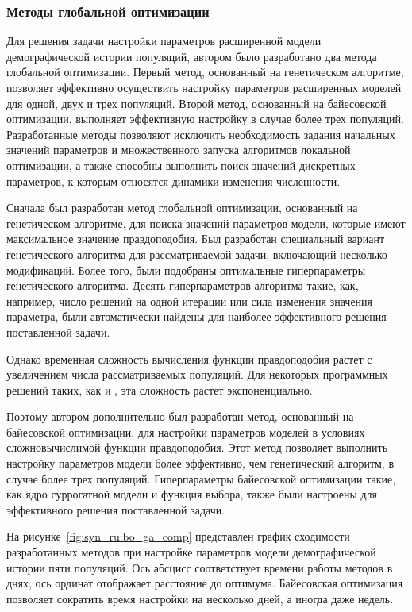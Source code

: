 \documentclass[a4paper,14pt,oneside,openany,article]{memoir}
\begin{document}
\subsubsection*{Методы глобальной оптимизации}

Для решения задачи настройки параметров расширенной модели демографической истории популяций, автором было разработано два метода глобальной оптимизации.
Первый метод, основанный на генетическом алгоритме, позволяет эффективно осуществить настройку параметров расширенных моделей для одной, двух и трех популяций.
Второй метод, основанный на байесовской оптимизации, выполняет эффективную настройку в случае более трех популяций.
Разработанные методы позволяют исключить необходимость задания начальных значений параметров и множественного запуска алгоритмов локальной оптимизации, а также способны выполнить поиск значений дискретных параметров, к которым относятся динамики изменения численности.

Сначала был разработан метод глобальной оптимизации, основанный на генетическом алгоритме, для поиска значений параметров модели, которые имеют максимальное значение правдоподобия.
Был разработан специальный вариант генетического алгоритма для рассматриваемой задачи, включающий несколько модификаций.
Более того, были подобраны оптимальные гиперпараметры генетического алгоритма.
Десять гиперпараметров алгоритма такие, как, например, число решений на одной итерации или сила изменения значения параметра, были автоматически найдены для наиболее эффективного решения поставленной задачи.

Однако временная сложность вычисления функции правдоподобия растет с увеличением числа рассматриваемых популяций.
Для некоторых программных решений таких, как \dadi и \moments, эта сложность растет экспоненциально.

Поэтому автором дополнительно был разработан метод, основанный на байесовской оптимизации, для настройки параметров моделей в условиях сложновычислимой функции правдоподобия.
Этот метод позволяет выполнить настройку параметров модели более эффективно, чем генетический алгоритм, в случае более трех популяций.
Гиперпараметры байесовской оптимизации такие, как ядро суррогатной модели и функция выбора, также были настроены для эффективного решения поставленной задачи.

На рисунке~\ref{fig:syn_ru:bo_ga_comp} представлен график сходимости разработанных методов при настройке параметров модели демографической истории пяти популяций.
Ось абсцисс соответствует времени работы методов в днях, ось ординат отображает расстояние до оптимума.
Байесовская оптимизация позволяет сократить время настройки на несколько дней, а иногда даже недель.
\end{document}

